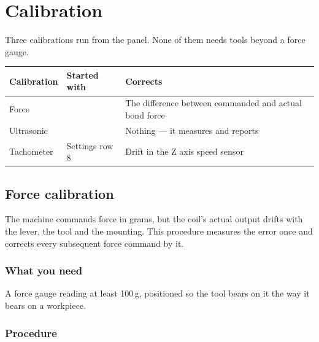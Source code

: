 \chapter{Calibration}
\label{ch:calibration}

Three calibrations run from the panel. None of them needs tools beyond a force
gauge.

\begin{center}\small
\begin{tabular}{@{}L{30mm}L{26mm}L{62mm}@{}}
\toprule
\textbf{Calibration} & \textbf{Started with} & \textbf{Corrects} \\
\midrule
Force        &  & The difference between commanded and actual
                                bond force \\
Ultrasonic   &   & Nothing --- it measures and reports \\
Tachometer   & Settings row 8 & Drift in the Z axis speed sensor \\
\bottomrule
\end{tabular}
\end{center}

\section{Force calibration}
\label{sec:force-cal}

The machine commands force in grams, but the coil's actual output drifts with
the lever, the tool and the mounting. This procedure measures the error once
and corrects every subsequent force command by it.

\subsection*{What you need}

A force gauge reading at least 100\,g, positioned so the tool bears on it the
way it bears on a workpiece.

\subsection*{Procedure}


